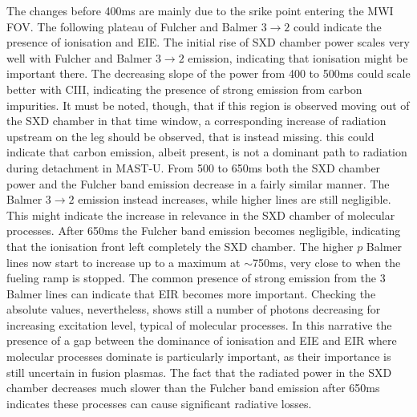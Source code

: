 The changes before 400ms are mainly due to the srike point entering the MWI FOV. The following plateau of Fulcher and Balmer $3 \rightarrow 2$ could indicate the presence of ionisation and EIE. The initial rise of SXD chamber power scales very well with Fulcher and Balmer $3 \rightarrow 2$ emission, indicating that ionisation might be important there. The decreasing slope of the power from 400 to 500ms could scale better with CIII, indicating the presence of strong emission from carbon impurities. It must be noted, though, that if this region is observed moving out of the SXD chamber in that time window, a corresponding increase of radiation upstream on the leg should be observed, that is instead missing. this could indicate that carbon emission, albeit present, is not a dominant path to radiation during detachment in MAST-U. From 500 to 650ms both the SXD chamber power and the Fulcher band emission decrease in a fairly similar manner. The Balmer $3 \rightarrow 2$ emission instead increases, while higher lines are still negligible. This might indicate the increase in relevance in the SXD chamber of molecular processes. After 650ms the Fulcher band emission becomes negligible, indicating that the ionisation front left completely the SXD chamber. The higher $p$ Balmer lines now start to increase up to a maximum at $\sim$750ms, very close to when the fueling ramp is stopped. The common presence of strong emission from the 3 Balmer lines can indicate that EIR becomes more important. Checking the absolute values, nevertheless, shows still a number of photons decreasing for increasing excitation level, typical of molecular processes. In this narrative the presence of a gap between the dominance of ionisation and EIE and EIR where molecular processes dominate is particularly important, as their importance is still uncertain in fusion plasmas. The fact that the radiated power in the SXD chamber decreases much slower than the Fulcher band emission after 650ms indicates these processes can cause significant radiative losses.
